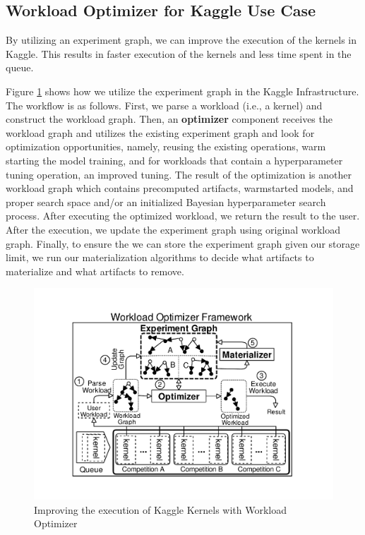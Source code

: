 \subsection{Workload Optimizer for Kaggle Use Case}
By utilizing an experiment graph, we can improve the execution of the kernels in Kaggle.
This results in faster execution of the kernels and less time spent in the queue.

Figure \ref{improved-use-case} shows how we utilize the experiment graph in the Kaggle Infrastructure. 
The workflow is as follows.
First, we parse a workload (i.e., a kernel) and construct the workload graph.
Then, an \textbf{optimizer} component receives the workload graph and utilizes the existing experiment graph and look for optimization opportunities, namely, reusing the existing operations, warm starting the model training, and for workloads that contain a hyperparameter tuning operation, an improved tuning.
The result of the optimization is another workload graph which contains precomputed artifacts, warmstarted models, and proper search space and/or an initialized Bayesian hyperparameter search process.
After executing the optimized workload, we return the result to the user.
After the execution, we update the experiment graph using original workload graph.
Finally, to ensure the we can store the experiment graph given our storage limit, we run our materialization algorithms to decide what artifacts to materialize and what artifacts to remove.

\begin{figure}
\centering
\includegraphics[width=\columnwidth]{../images/kaggle-workload-optimizer}
\caption{Improving the execution of Kaggle Kernels with Workload Optimizer}
\label{improved-use-case}
\end{figure}

